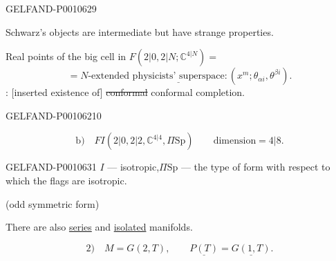 \begin{GelfandAdjacentEvidence}{GELFAND-P001062}{9}


Schwarz’s objects are intermediate but have strange properties.

Real points of the big cell in \(F(2|0,2|N;\mathbb C^{4|N})=\)
\[
=N\text{-extended }\underline{\text{physicists’ superspace}}:
 (x^m;\theta_{\alpha i},\theta^{\beta i}).
\]
: [inserted existence of] \sout{conformal}
conformal completion.
\end{GelfandAdjacentEvidence}
\begin{GelfandAdjacentEvidence}{GELFAND-P001062}{10}


\[
\text{b)}\quad FI(2|0,2|2,\mathbb C^{4|4},\Pi\mathrm{Sp})
  \qquad \text{dimension}=4|8.
\]
\end{GelfandAdjacentEvidence}



\begin{GelfandAdjacentEvidence}{GELFAND-P001063}{1}
\(I\) — isotropic,\quad \(\Pi\mathrm{Sp}\) — the type of form with respect to which the flags are isotropic.

(odd symmetric form)

There are also \underline{series} and \underline{isolated} manifolds.
\end{GelfandAdjacentEvidence}


\[
2)\quad M=G(2,T),\qquad \underline{P(T)}=\underline{G(1,T)}.
\]


